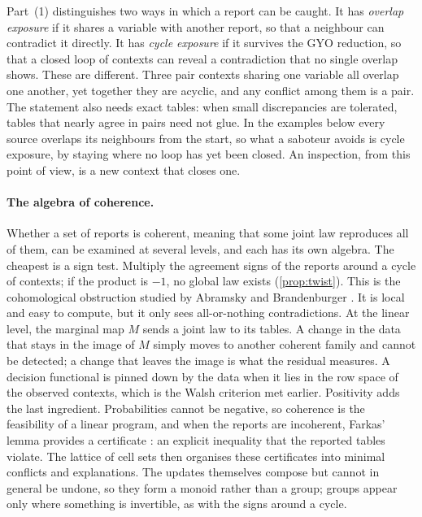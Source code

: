 \documentclass[11pt]{article}
\theoremstyle{definition}\newtheorem{definition}[theorem]{Definition}\newtheorem{remark}[theorem]{Remark}\newtheorem{example}[theorem]{Example}\newtheorem{problem}[theorem]{Open problem}\crefname{problem}{Problem}{Problems}
\begin{document}
Part~(1) distinguishes two ways in which a report can be caught. It has \emph{overlap exposure} if it shares a variable with another report, so that a neighbour can contradict it directly. It has \emph{cycle exposure} if it survives the GYO reduction, so that a closed loop of contexts can reveal a contradiction that no single overlap shows. These are different. Three pair contexts sharing one variable all overlap one another, yet together they are acyclic, and any conflict among them is a pair. The statement also needs exact tables: when small discrepancies are tolerated, tables that nearly agree in pairs need not glue. In the examples below every source overlaps its neighbours from the start, so what a saboteur avoids is cycle exposure, by staying where no loop has yet been closed. An inspection, from this point of view, is a new context that closes one.

\paragraph{The algebra of coherence.} Whether a set of reports is coherent, meaning that some joint law reproduces all of them, can be examined at several levels, and each has its own algebra. The cheapest is a sign test. Multiply the agreement signs of the reports around a cycle of contexts; if the product is $-1$, no global law exists (\cref{prop:twist}). This is the cohomological obstruction studied by Abramsky and Brandenburger \cite{AbramskyBrandenburger2011}. It is local and easy to compute, but it only sees all-or-nothing contradictions. At the linear level, the marginal map $M$ sends a joint law to its tables. A change in the data that stays in the image of $M$ simply moves to another coherent family and cannot be detected; a change that leaves the image is what the residual measures. A decision functional is pinned down by the data when it lies in the row space of the observed contexts, which is the Walsh criterion met earlier. Positivity adds the last ingredient. Probabilities cannot be negative, so coherence is the feasibility of a linear program, and when the reports are incoherent, Farkas' lemma provides a certificate \cite{Schrijver1986}: an explicit inequality that the reported tables violate. The lattice of cell sets then organises these certificates into minimal conflicts and explanations. The updates themselves compose but cannot in general be undone, so they form a monoid rather than a group; groups appear only where something is invertible, as with the signs around a cycle.
\end{document}
